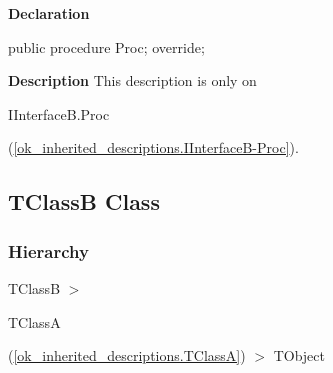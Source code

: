 \documentclass{report}
\newif\ifpdf
\begin{document}
\label{ok_inherited_descriptions.IInterfaceB-Proc}
\begin{list}{}{
\setlength{\itemindent}{0cm}
\setlength{\listparindent}{0cm}
\setlength{\leftmargin}{\evensidemargin}
\addtolength{\leftmargin}{\tmplength}
\settowidth{\labelsep}{X}
\addtolength{\leftmargin}{\labelsep}
\setlength{\labelwidth}{\tmplength}
}
\item[\textbf{Declaration}\hfill]
\ifpdf
\begin{flushleft}
\fi
\begin{ttfamily}
public procedure Proc; override;\end{ttfamily}

\ifpdf
\end{flushleft}
\fi

\par
\item[\textbf{Description}]
This description is only on \begin{ttfamily}IInterfaceB.Proc\end{ttfamily}(\ref{ok_inherited_descriptions.IInterfaceB-Proc}).

\end{list}
\ifpdf
\subsection*{\large{\textbf{TClassB Class}}\normalsize\hspace{1ex}\hrulefill}
\else
\subsection*{TClassB Class}
\fi
\label{ok_inherited_descriptions.TClassB}
\subsubsection*{\large{\textbf{Hierarchy}}\normalsize\hspace{1ex}\hfill}
TClassB {$>$} \begin{ttfamily}TClassA\end{ttfamily}(\ref{ok_inherited_descriptions.TClassA}) {$>$} 
TObject
\end{document}
